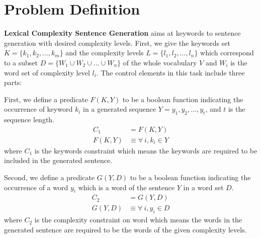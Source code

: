 \documentclass[11pt]{article}
\begin{document}
\section{Problem Definition} \label{define}

\textbf{Lexical Complexity Sentence Generation} aims at keywords to sentence generation with desired complexity levels. First, we give the keywords set $K=\{k_1,k_2,...,k_m\}$ and the complexity levels $L=\{l_1,l_2,...,l_n\}$ which correspond to a subset $D=\{W_1\cup W_2 \cup ...\cup W_n\}$ of the whole vocabulary $V$ and $W_i$ is the word set of complexity level $l_i$. The control elements in this task include three parts:

First, we define a predicate $F(K,Y)$ to be a boolean function indicating the occurrence of keyword $k_i$ in a generated sequence $Y=y_1, y_2,...,y_t$, and $t$ is the sequence length.
\begin{align}
    C_1 &= F(K, Y) \\
    F(K, Y) &\equiv \forall \ i, k_i \in Y
\end{align}
where $C_1$ is the keywords constraint which means the keywords are required to be included in the generated sentence.

Second, we define a predicate $G(Y,D)$ to be a boolean function indicating the occurrence of a word  $y_i$ which is a word of the sentence $Y$ in a word set $D$. 
\begin{align}
    C_2 &= G(Y, D) \\ \label{equation:c2}
    G(Y, D) &\equiv \forall \ i, y_i \in D
\end{align}
where $C_2$ is the complexity constraint on word which means the words in the generated sentence are required to be the words of the given complexity levels.
\end{document}
